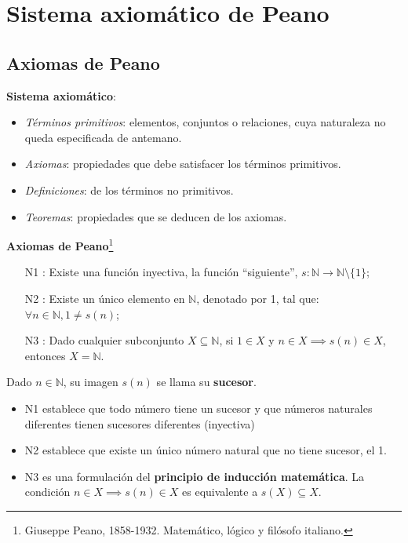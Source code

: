 \section{Sistema axiomático de Peano} 

\subsection{Axiomas de Peano}
\textbf{Sistema axiomático}:

\begin{itemize}
	\item \textit{Términos primitivos}: elementos, conjuntos o relaciones, cuya naturaleza no queda especificada de antemano.
	\item \textit{Axiomas}: propiedades que debe satisfacer los términos primitivos.
	\item \textit{Definiciones}: de los términos no primitivos.
	\item \textit{Teoremas}: propiedades que se deducen de los axiomas.
\end{itemize}

\textbf{Axiomas de Peano}\footnote{Giuseppe Peano, 1858-1932. Matemático, lógico y filósofo italiano.} \label{sec:peano} 
\begin{itemize}
	\item[N1]: Existe una función inyectiva, la función ``siguiente'', $s: \mathbb{N} \rightarrow \mathbb{N} \setminus \{1\}$;
	\item[N2]: Existe un único elemento en $\mathbb{N}$, denotado por 1, tal que: $\forall n \in \mathbb{N}, 1 \ne s(n)$;
	\item[N3]: Dado cualquier subconjunto $X \subseteq \mathbb{N}$, si $1 \in X$ y $n \in X \implies s(n) \in X$, entonces $X = \mathbb{N}$.
\end{itemize}
Dado $n \in \mathbb{N}$, su imagen $s(n)$ se llama su \textbf{sucesor}.
\begin{itemize}
	\item N1 establece que todo número tiene un sucesor y que números naturales diferentes tienen sucesores diferentes (inyectiva)
	\item N2 establece que existe un único número natural que no tiene sucesor, el 1.
	\item N3 es una formulación del \textbf{principio de inducción matemática}. La condición $n \in X \implies s(n) \in X$ es equivalente a $s(X) \subseteq X$.
\end{itemize}

